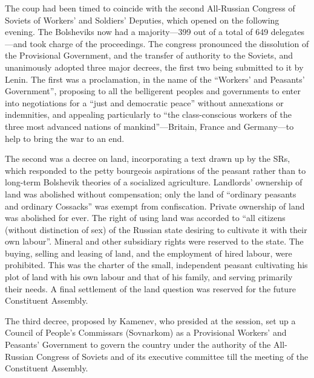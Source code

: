 The coup had been timed to coincide with the second All-Russian Congress of Soviets of Workers' and Soldiers' Deputies, which opened on the following evening. The Bolsheviks now had a majority---399 out of a total of 649 delegates---and took charge of the proceedings. The congress pronounced the dissolution of the Provisional Government, and the transfer of authority to the Soviets, and unanimously adopted three major decrees, the first two being submitted to it by Lenin. The first was a proclamation, in the name of the ``Workers' and Peasants' Government'', proposing to all the belligerent peoples and governments to enter into negotiations for a ``just and democratic peace'' without annexations or indemnities, and appealing particularly to ``the class-conscious workers of the three most advanced nations of mankind''---Britain, France and Germany---to help to bring the war to an end. 

The second was a decree on land, incorporating a text drawn up by the SRs, which responded to the petty bourgeois aspirations of the peasant rather than to long-term Bolshevik theories of a socialized agriculture. Landlords' ownership of land was abolished without compensation; only the land of ``ordinary peasants and ordinary Cossacks'' was exempt from confiscation. Private ownership of land was abolished for ever. The right of using land was accorded to ``all citizens (without distinction of sex) of the Russian state desiring to cultivate it with their own labour''. Mineral and other subsidiary rights were reserved to the state. The buying, selling and leasing of land, and the employment of hired labour, were prohibited. This was the charter of the small, independent peasant cultivating his plot of land with his own labour and that of his family, and serving primarily their needs. A final settlement of the land question was reserved for the future Constituent Assembly. 

The third decree, proposed by Kamenev, who presided at the session, set up a Council of People's Commissars (Sovnarkom) as a Provisional Workers' and Peasants' Government to govern the country under the authority of the All-Russian Congress of Soviets and of its executive committee till the meeting of the Constituent Assembly. 

